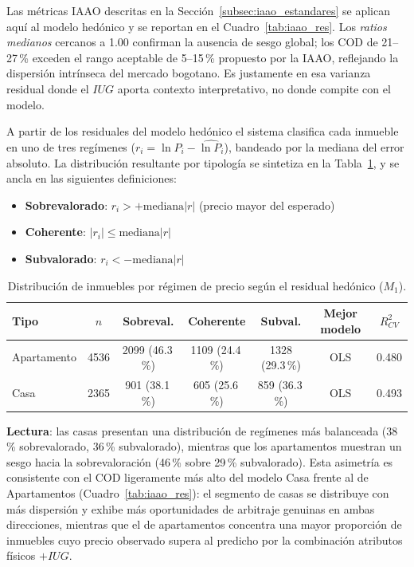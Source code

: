 \documentclass[12pt, a4paper, twoside, openright]{report}
\theoremstyle{plain}
\theoremstyle{definition}
\newcommand{\IUG}{IUG}             %
\begin{document}
Las métricas IAAO descritas en la Sección~\ref{subsec:iaao_estandares} se aplican aquí al modelo hedónico y se reportan en el Cuadro~\ref{tab:iaao_res}. Los \emph{ratios medianos} cercanos a 1.00 confirman la ausencia de sesgo global; los COD de 21--27\,\% exceden el rango aceptable de 5--15\,\% propuesto por la IAAO, reflejando la dispersión intrínseca del mercado bogotano. Es justamente en esa varianza residual donde el $\IUG{}$ aporta contexto interpretativo, no donde compite con el modelo.

A partir de los residuales del modelo hedónico el sistema clasifica cada inmueble en uno de tres regímenes ($r_i = \ln P_i - \widehat{\ln P_i}$), bandeado por la mediana del error absoluto. La distribución resultante por tipología se sintetiza en la Tabla~\ref{tab:market_summary}, y se ancla en las siguientes definiciones:

\begin{itemize}
    \item \textbf{Sobrevalorado}: $r_i > +\text{mediana}|r|$ (precio mayor del esperado)
    \item \textbf{Coherente}: $|r_i| \leq \text{mediana}|r|$
    \item \textbf{Subvalorado}: $r_i < -\text{mediana}|r|$
\end{itemize}

\begin{table}[htbp]
\centering
\caption{Distribución de inmuebles por régimen de precio según el residual hedónico ($M_1$).}
\label{tab:market_summary}
\small
\begin{tabular}{@{}lcccccc@{}}
\toprule
\textbf{Tipo} & $n$ & \textbf{Sobreval.} & \textbf{Coherente} & \textbf{Subval.} & \textbf{Mejor modelo} & $R^2_{CV}$ \\
\midrule
Apartamento & \num{4536} & \num{2099} (46.3\,\%) & \num{1109} (24.4\,\%) & \num{1328} (29.3\,\%) & OLS & 0.480 \\
Casa        & \num{2365} & \num{901} (38.1\,\%) & \num{605} (25.6\,\%) & \num{859} (36.3\,\%) & OLS & 0.493 \\
\bottomrule
\end{tabular}
\end{table}

\textbf{Lectura}: las casas presentan una distribución de regímenes más balanceada (38\,\% sobrevalorado, 36\,\% subvalorado), mientras que los apartamentos muestran un sesgo hacia la sobrevaloración (46\,\% sobre 29\,\% subvalorado). Esta asimetría es consistente con el COD ligeramente más alto del modelo Casa frente al de Apartamentos (Cuadro~\ref{tab:iaao_res}): el segmento de casas se distribuye con más dispersión y exhibe más oportunidades de arbitraje genuinas en ambas direcciones, mientras que el de apartamentos concentra una mayor proporción de inmuebles cuyo precio observado supera al predicho por la combinación atributos físicos $+\IUG{}$.
\end{document}
